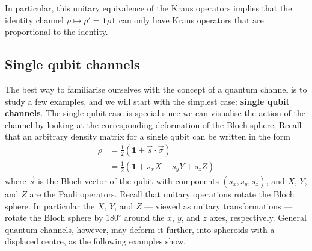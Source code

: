\documentclass[fleqn]{article}
\begin{document}
In particular, this unitary equivalence of the Kraus operators implies that the identity channel \(\rho\mapsto\rho'=\mathbf{1}\rho\mathbf{1}\) can only have Kraus operators that are proportional to the identity.

\hypertarget{single-qubit-channels}{%
\subsection{Single qubit channels}\label{single-qubit-channels}}

The best way to familiarise ourselves with the concept of a quantum channel is to study a few examples, and we will start with the simplest case: \textbf{single qubit channels}.
The single qubit case is special since we can visualise the action of the channel by looking at the corresponding deformation of the Bloch sphere.
Recall that an arbitrary density matrix for a single qubit can be written in the form
\[
  \begin{aligned}
    \rho
    &= \frac{1}{2}\left(\mathbf{1}+\vec{s}\cdot \vec\sigma\right)
  \\&= \frac{1}{2}\left(\mathbf{1}+s_x X+ s_y Y + s_z Z\right)
  \end{aligned}
\]
where \(\vec{s}\) is the Bloch vector of the qubit with components \((s_x, s_y, s_z)\), and \(X\), \(Y\), and \(Z\) are the Pauli operators.
Recall that unitary operations rotate the Bloch sphere.
In particular the \(X\), \(Y\), and \(Z\) --- viewed as unitary transformations --- rotate the Bloch sphere by \(180^\circ\) around the \(x\), \(y\), and \(z\) axes, respectively.
General quantum channels, however, may deform it further, into spheroids with a displaced centre, as the following examples show.
\end{document}

